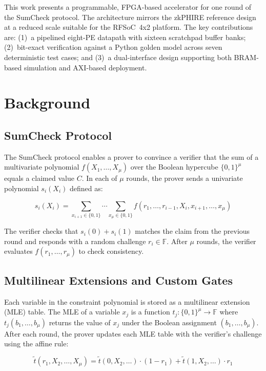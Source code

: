 \documentclass[conference]{IEEEtran}
\begin{document}
This work presents a programmable, FPGA-based accelerator for one round of the SumCheck protocol. The architecture mirrors the zkPHIRE reference design~\cite{zkphire2026} at a reduced scale suitable for the RFSoC~4x2 platform. The key contributions are: (1)~a pipelined eight-PE datapath with sixteen scratchpad buffer banks; (2)~bit-exact verification against a Python golden model across seven deterministic test cases; and (3)~a dual-interface design supporting both BRAM-based simulation and AXI-based deployment.

\section{Background}

\subsection{SumCheck Protocol}

The SumCheck protocol enables a prover to convince a verifier that the sum of a multivariate polynomial $f(X_1,\dots,X_\mu)$ over the Boolean hypercube $\{0,1\}^\mu$ equals a claimed value $C$. In each of $\mu$ rounds, the prover sends a univariate polynomial $s_i(X_i)$ defined as:

\begin{equation}
s_i(X_i) = \sum_{x_{i+1}\in\{0,1\}}\cdots\sum_{x_\mu\in\{0,1\}} f(r_1,\dots,r_{i-1},X_i,x_{i+1},\dots,x_\mu)
\end{equation}

The verifier checks that $s_i(0)+s_i(1)$ matches the claim from the previous round and responds with a random challenge $r_i \in \mathbb{F}$. After $\mu$ rounds, the verifier evaluates $f(r_1,\dots,r_\mu)$ to check consistency.

\subsection{Multilinear Extensions and Custom Gates}

Each variable in the constraint polynomial is stored as a multilinear extension (MLE) table. The MLE of a variable $x_j$ is a function $t_j:\{0,1\}^\mu\to\mathbb{F}$ where $t_j(b_1,\dots,b_\mu)$ returns the value of $x_j$ under the Boolean assignment $(b_1,\dots,b_\mu)$. After each round, the prover updates each MLE table with the verifier's challenge using the affine rule:

\begin{equation}
\tilde{t}(r_1, X_2,\dots,X_\mu) = \tilde{t}(0, X_2,\dots) \cdot (1-r_1) + \tilde{t}(1, X_2,\dots) \cdot r_1
\end{equation}
\end{document}
